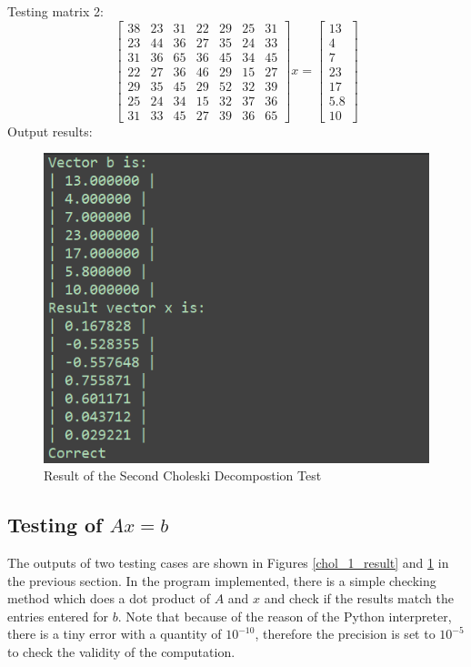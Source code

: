 \documentclass[a4paper,titlepage]{article}
\begin{document}
			Testing matrix 2:
			$$
				\begin{bmatrix}
				38 & 23& 31& 22& 29& 25& 31\\
				23& 44& 36& 27& 35& 24& 33\\
				31& 36& 65& 36& 45& 34& 45\\
				22& 27& 36& 46& 29& 15& 27\\
				29& 35& 45& 29& 52& 32& 39\\
				25& 24& 34& 15& 32& 37& 36\\
				31& 33& 45& 27& 39& 36& 65
				\end{bmatrix}x = \begin{bmatrix}
				13\\4\\7\\23\\17\\5.8\\10
				\end{bmatrix}
			$$
			Output results:
			\begin{figure}[!h]
				\centering
				\includegraphics[width=\linewidth]{chol_2_result}
				\caption{Result of the Second Choleski Decompostion Test}
				\label{chol_2_result}
			\end{figure}
		\subsection{Testing of $Ax = b$}
			The outputs of two testing cases are shown in Figures \ref{chol_1_result} and \ref{chol_2_result} in the previous section. In the program implemented, there is a simple checking method which does a dot product of $A$ and $x$ and check if the results match the entries entered for $b$. Note that because of the reason of the Python interpreter, there is a tiny error with a quantity of $10^{-10}$, therefore the precision is set to $10^{-5}$ to check the validity of the computation.
\end{document}
